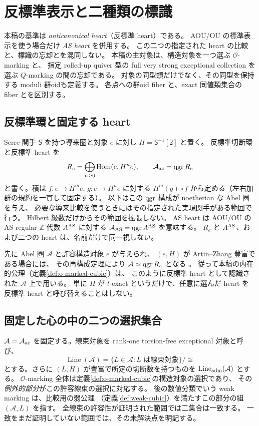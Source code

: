 \section{反標準表示と二種類の標識}\label{sec:ac-set-framework}
本稿の基準は \emph{anticanonical heart}（反標準 heart）である。
AOU/OU の標準表示を使う場合だけ \emph{AS heart} を併用する。
この二つの指定された heart の比較と、標識の忘却とを混同しない。
本稿の主対象は、構造対象を一つ選ぶ $\mathcal O$-marking と、
指定 rolled-up quiver 型の full very strong exceptional collection を選ぶ
$Q$-marking の間の忘却である。
対象の同型類だけでなく、その同型を保持する moduli 群oidも定義する。
各点への群oid fiber と、exact 同値類集合の fiber とを区別する。

\subsection{反標準環と固定する heart}
Serre 関手 $\mathsf S$ を持つ導来圏と対象 $e$ に対し $H=\mathsf S^{-1}[2]$ と置く。
反標準切断環と反標準 heart を
\begin{equation}\label{eq:ac-ring-heart}
 R_e=\bigoplus_{n\ge0}\operatorname{Hom}(e,H^ne),\qquad
 \mathcal A_{\rm ac}=\operatorname{qgr} R_e
\end{equation}
と書く。積は $f:e\to H^me$, $g:e\to H^ne$ に対する
$H^m(g)\circ f$ から定める（左右加群の規約を一貫して固定する）。
以下はこの $\operatorname{qgr}$ 構成が noetherian な Abel 圏を与え、
必要な導来比較を使うときにはその指定された実現関手がある範囲で行う。
Hilbert 級数だけからその範囲を拡張しない。
AS heart は AOU/OU の AS-regular $\mathbb Z$-代数 $A^{\rm AS}$ に対する
$\mathcal A_{\rm AS}=\operatorname{qgr} A^{\rm AS}$ を意味する。
$R_e$ と $A^{\rm AS}$、および二つの heart は、名前だけで同一視しない。

先に Abel 圏 $\mathcal A$ と許容構造対象 $e$ が与えられ、
$(e,H)$ が Artin--Zhang 豊富である場合には、
その再構成定理により $\mathcal A\simeq\operatorname{qgr} R_e$ となる
\cite[Theorem 4.5]{AZ}。
従って本稿の内在的公理（定義\ref{def:o-marked-cubic}）は、
このように反標準 heart として認識された $\mathcal A$ 上で用いる。
単に $H$ が $t$-exact というだけで、任意に選んだ heart を
反標準 heart と呼び替えることはしない。

\subsection{固定した心の中の二つの選択集合}
$\mathcal A=\mathcal A_{\rm ac}$ を固定する。線束対象を
rank-one torsion-free exceptional 対象と呼び、
\[
 \operatorname{Line}(\mathcal A)=
 \{L\in\mathcal A:L\text{ は線束対象}\}/\cong
\]
とする。さらに $(L,H)$ が豊富で所定の切断数を持つものを
$\operatorname{Line}_{\rm adm}(\mathcal A)$ とする。
$\mathcal O$-marking 全体は定義\ref{def:o-marked-cubic}の構造対象の選択であり、
その\emph{例外的部分}がこの許容線束の選択に対応する。
後の数値分類でいう weak marking は、比較用の弱公理
（定義\ref{def:weak-cubic}）を満たすこの部分の組 $(\mathcal A,L)$ を指す。
全線束の許容性が証明された範囲では二集合は一致する。
一致をまだ証明していない範囲では、その未解決点を明記する。


